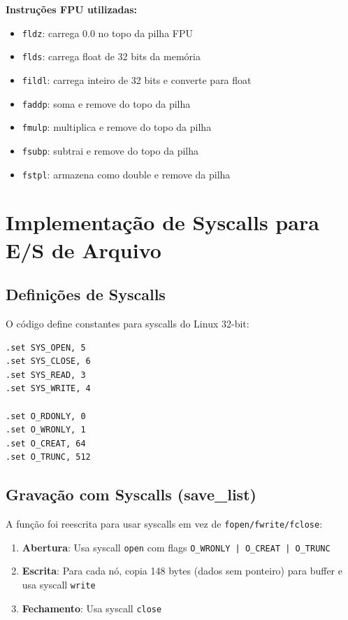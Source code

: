 \documentclass[12pt]{article}
\begin{document}
\textbf{Instruções FPU utilizadas:}
\begin{itemize}
    \item \texttt{fldz}: carrega 0.0 no topo da pilha FPU
    \item \texttt{flds}: carrega float de 32 bits da memória
    \item \texttt{fildl}: carrega inteiro de 32 bits e converte para float
    \item \texttt{faddp}: soma e remove do topo da pilha
    \item \texttt{fmulp}: multiplica e remove do topo da pilha
    \item \texttt{fsubp}: subtrai e remove do topo da pilha
    \item \texttt{fstpl}: armazena como double e remove da pilha
\end{itemize}

\section{Implementação de Syscalls para E/S de Arquivo}

\subsection{Definições de Syscalls}
O código define constantes para syscalls do Linux 32-bit:

\begin{verbatim}
.set SYS_OPEN, 5
.set SYS_CLOSE, 6
.set SYS_READ, 3
.set SYS_WRITE, 4

.set O_RDONLY, 0
.set O_WRONLY, 1
.set O_CREAT, 64
.set O_TRUNC, 512
\end{verbatim}

\subsection{Gravação com Syscalls (save\_list)}
A função foi reescrita para usar syscalls em vez de \texttt{fopen/fwrite/fclose}:

\begin{enumerate}
    \item \textbf{Abertura}: Usa syscall \texttt{open} com flags \texttt{O\_WRONLY | O\_CREAT | O\_TRUNC}
    \item \textbf{Escrita}: Para cada nó, copia 148 bytes (dados sem ponteiro) para buffer e usa syscall \texttt{write}
    \item \textbf{Fechamento}: Usa syscall \texttt{close}
\end{enumerate}
\end{document}
